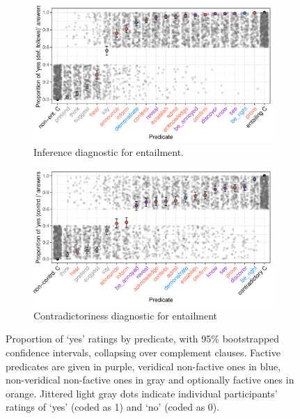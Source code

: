 \documentclass[11pt,fleqn]{article}
\newcommand{\6}{\mbox{$[\hspace*{-.6mm}[$}}
\newcommand{\9}{\mbox{$]\hspace*{-.6mm}]$}}
\begin{document}
{\begin{figure}[H]
\begin{subfigure}{1\textwidth}
\centering
\includegraphics[width=.7\paperwidth]{../results/7-veridicality3-binary/graphs/proportion-by-predicate-variability-individual}
\caption{Inference diagnostic for entailment.}
\end{subfigure}

\begin{subfigure}{1\textwidth}
\centering
\includegraphics[width=.7\paperwidth]{../results/6-veridicality2-binary/graphs/proportion-by-predicate-variability-individual}
\caption{Contradictoriness diagnostic for entailment}
\end{subfigure} 

\caption{Proportion of `yes' ratings by predicate, with 95\% bootstrapped confidence intervals, collapsing over complement clauses. Factive predicates are given in purple, veridical non-factive ones in blue, non-veridical non-factive ones in gray and optionally factive ones in orange. Jittered light gray dots indicate individual participants' ratings of `yes' (coded as 1) and `no' (coded as 0). }
\label{f-binary}
\end{figure}

}
\end{document}
